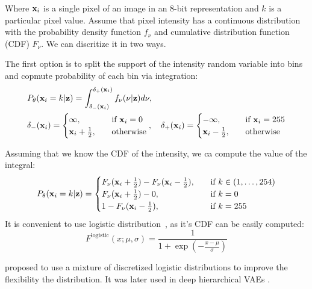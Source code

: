 Where ${\mathbf{x}}_i$ is a single pixel of an image in an 8-bit representation and $k$ is a particular pixel value. 
Assume that pixel intensity has a continuous distribution with the probability density function $f_{\nu}$ and cumulative distribution function (CDF) $F_{\nu}$. We can discritize it in two ways. 

The first option is to split the support of the intensity random variable into bins and copmute probability of each bin via integration:
\begin{equation}
\begin{aligned}
    &P_{\theta}({\mathbf{x}}_i = k|{\mathbf{z}}) = \int_{\delta_{-}({\mathbf{x}}_i)}^{\delta_{+}({\mathbf{x}}_i)} f_{\nu}(\nu|{\mathbf{z}})d\nu,\\
    &\delta_{-}({\mathbf{x}}_i) =
    \begin{cases}
        \infty,\quad &\text{if } {\mathbf{x}}_i = 0\\
        {\mathbf{x}}_i + \frac12,\quad&\text{otherwise}
    \end{cases},  \quad
    \delta_{+}({\mathbf{x}}_i) =
    \begin{cases}
        -\infty,\quad &\text{if } {\mathbf{x}}_i = 255\\
        {\mathbf{x}}_i - \frac12,\quad&\text{otherwise}
    \end{cases} 
\end{aligned}
\end{equation}

Assuming that we know the CDF of the intensity, we ca compute the value of the integral:
\begin{equation}
    P_{\theta}({\mathbf{x}}_i = k|{\mathbf{z}}) =\begin{cases}
    F_{\nu}({\mathbf{x}}_i + \frac{1}{2}) - F_{\nu}({\mathbf{x}}_i - \frac{1}{2}),\quad &\text{if } k \in (1, \dots, 254) \\
    F_{\nu}({\mathbf{x}}_i + \frac{1}{2}) - 0,\quad &\text{if } k = 0 \\
    1 - F_{\nu}({\mathbf{x}}_i - \frac{1}{2}),\quad &\text{if } k = 255 \\
    \end{cases}
\end{equation}
It is convenient to use logistic distribution~\cite{kingma2016improved}, as it's CDF can be easily computed:
\begin{equation}
    F^{\text{logistic}}(x; \mu, \sigma) = \frac{1}{1 + \exp (- \frac{x - \mu}{\sigma})}
\end{equation}

\citet{salimans2016improved} proposed to use a mixture of discretized logistic distributions to improve the flexibility the distribution. It was later used in deep hierarchical VAEs \citep{vahdat2020nvae, Child2020-ze}.

